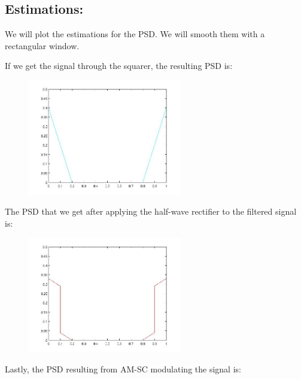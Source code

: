 \documentclass[a4paper,11pt]{article}
\begin{document}
\newpage

\subsection{Estimations:}

We will plot the estimations for the PSD. We will smooth them with a rectangular window. 

If we get the signal through the squarer, the resulting PSD is:

\begin{figure}[!hp]
    \begin{center}
    \includegraphics[width=0.6\textwidth]{images/lab3_redo_26.jpg}
    \end{center}
\end{figure}

The PSD that we get after applying the half-wave rectifier to the filtered signal is:

\begin{figure}[!hp]
    \begin{center}
    \includegraphics[width=0.6\textwidth]{images/lab3_redo_27.jpg}
    \end{center}
\end{figure}

\newpage

Lastly, the PSD resulting from AM-SC modulating the signal is:
\end{document}

